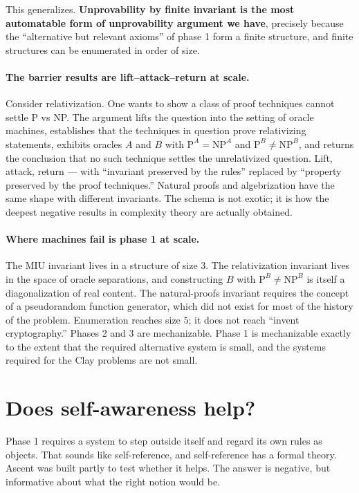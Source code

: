 \documentclass[11pt,a4paper]{article}
\begin{document}
This generalizes. \textbf{Unprovability by finite invariant is the most
automatable form of unprovability argument we have}, precisely because the
``alternative but relevant axioms'' of phase 1 form a finite structure, and
finite structures can be enumerated in order of size.

\paragraph{The barrier results are lift--attack--return at scale.} Consider
relativization. One wants to show a class of proof techniques cannot settle
P vs NP. The argument lifts the question into the setting of oracle machines,
establishes that the techniques in question prove relativizing statements,
exhibits oracles $A$ and $B$ with $\mathrm{P}^A = \mathrm{NP}^A$ and
$\mathrm{P}^B \neq \mathrm{NP}^B$, and returns the conclusion that no such
technique settles the unrelativized question. Lift, attack, return --- with
``invariant preserved by the rules'' replaced by ``property preserved by the
proof techniques.'' Natural proofs and algebrization have the same shape with
different invariants. The schema is not exotic; it is how the deepest negative
results in complexity theory are actually obtained.

\paragraph{Where machines fail is phase 1 at scale.} The MIU invariant lives in
a structure of size $3$. The relativization invariant lives in the space of
oracle separations, and constructing $B$ with $\mathrm{P}^B \neq \mathrm{NP}^B$
is itself a diagonalization of real content. The natural-proofs invariant
requires the concept of a pseudorandom function generator, which did not exist
for most of the history of the problem. Enumeration reaches size $5$; it does
not reach ``invent cryptography.'' Phases 2 and 3 are mechanizable. Phase 1 is
mechanizable exactly to the extent that the required alternative system is
small, and the systems required for the Clay problems are not small.

\section{Does self-awareness help?}

Phase 1 requires a system to step outside itself and regard its own rules as
objects. That sounds like self-reference, and self-reference has a formal
theory. Ascent was built partly to test whether it helps. The answer is
negative, but informative about what the right notion would be.
\end{document}
